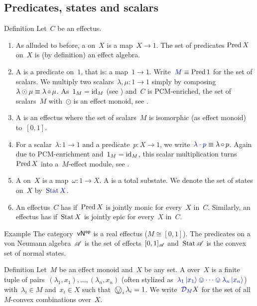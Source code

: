 \documentclass[b]{subfiles}
\begin{document}
\subsection{Predicates, states and scalars}
\begin{parsec}%
\begin{point}{Definition}%
Let~$C$ be an effectus.
\begin{enumerate}
\item
As alluded to before,
a  on~$X$ is a map~$X \to 1$.
The set of predicates $\operatorname{Pred} X$ on~$X$ is (by definition) an effect algebra.
\item
A  is a predicate on~$1$, that is: a map~$1 \to 1$.
Write~$\Define{M} \equiv \Pred 1$ for the set of scalars.
We multiply two scalars~$\lambda,\mu \colon 1 \to 1$
    simply by composing~$\lambda \odot \mu \equiv \lambda \mathop{\circ} \mu$.
As~$1_M = \operatorname{id}_M$ (see ) and~$C$ is PCM-enriched,
    the set of scalars~$M$ with~$\odot$
    is an effect monoid,
    see .
\item
A  is an effectus
where the set of scalars~$M$ is isomorphic (as effect monoid) to~$[0,1]$.
\item
For a scalar~$\lambda\colon 1\to 1$ and a predicate~$p\colon X \to 1$,
we write~$\Define{\lambda \cdot p} \equiv \lambda \after p$.
Again due to PCM-enrichment and~$1_M = \operatorname{id}_M$,
this scalar multiplication
turns~$\operatorname{Pred} X$ into a~$M$-effect module, see .
\item
A  on~$X$ is a map~$\omega\colon 1 \to X$.
A  is a total substate.
We denote the set of states on~$X$ by~$\Define{\Stat X}$.
\item
An effectus~$C$ has 
    if~$\operatorname{Pred} X$ is jointly monic for every~$X$ in~$C$.
    Similarly, an effectus has 
    if~$\operatorname{Stat} X$ is jointly epic for every~$X$ in~$C$.
\end{enumerate}
\end{point}
\begin{point}{Example}%
The category~${\mathsf{vN}}{^{\mathsf{op}}}$ is a real effectus ($M \cong [0,1]$).
The predicates on a von Neumann algebra~$\mathscr{A}$
    is the set of effects~$[0,1]_{\mathscr{A}}$
    and~$\operatorname{Stat} \mathscr{A}$ is the convex set of normal states.
\end{point}
\begin{point}{Definition}%
Let~$M$ be an effect monoid
    and~$X$ be any set.
A  over~$X$
is a finite tuple of pairs~$(\lambda_1, x_1), \ldots, (\lambda_n, x_n)$
(often stylized as~$\Define{\lambda_1 \ket{x_1} \ovee \cdots \ovee \lambda_n \ket{x_n}}$)
    with~$\lambda_i \in M$ and~$x_i \in X$
    such that~$\bigovee_i \lambda_i = 1$.
We write~$\Define{\mathcal{D}_M} X$
    for the set of all~$M$-convex combinations over~$X$.
\end{point}
\end{parsec}
\end{document}
